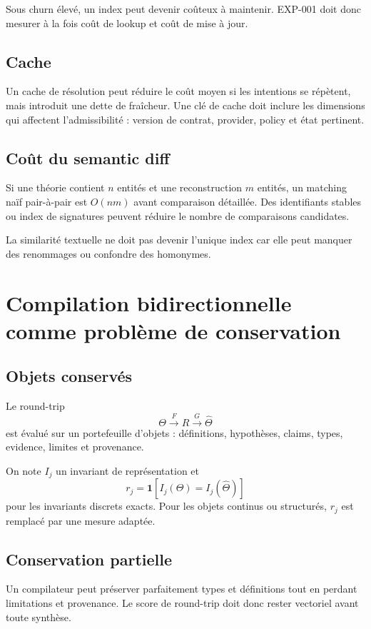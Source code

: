 Sous churn élevé, un index peut devenir coûteux à maintenir. EXP-001 doit donc mesurer à la fois coût de lookup et coût de mise à jour.

\section{Cache}

Un cache de résolution peut réduire le coût moyen si les intentions se répètent, mais introduit une dette de fraîcheur. Une clé de cache doit inclure les dimensions qui affectent l'admissibilité : version de contrat, provider, policy et état pertinent.

\section{Coût du semantic diff}

Si une théorie contient $n$ entités et une reconstruction $m$ entités, un matching naïf pair-à-pair est $O(nm)$ avant comparaison détaillée. Des identifiants stables ou index de signatures peuvent réduire le nombre de comparaisons candidates.

La similarité textuelle ne doit pas devenir l'unique index car elle peut manquer des renommages ou confondre des homonymes.

\chapter{Compilation bidirectionnelle comme problème de conservation}

\section{Objets conservés}

Le round-trip
\[
\Theta\xrightarrow{F}R\xrightarrow{G}\widehat\Theta
\]
est évalué sur un portefeuille d'objets : définitions, hypothèses, claims, types, evidence, limites et provenance.

On note $I_j$ un invariant de représentation et
\[
r_j=\mathbf 1[I_j(\Theta)=I_j(\widehat\Theta)]
\]
pour les invariants discrets exacts. Pour les objets continus ou structurés, $r_j$ est remplacé par une mesure adaptée.

\section{Conservation partielle}

Un compilateur peut préserver parfaitement types et définitions tout en perdant limitations et provenance. Le score de round-trip doit donc rester vectoriel avant toute synthèse.

